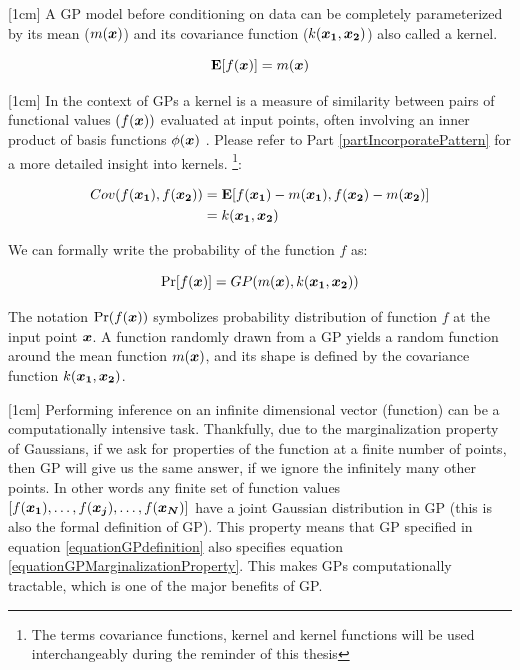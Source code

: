 [1cm]
A GP model before conditioning on data can be completely parameterized by its mean ($m(\boldsymbol{x})$) and its covariance function ($k(\boldsymbol{x_1}, \boldsymbol{x_2})$) also called a kernel. 

\begin{equation}\label{eq:meanGP}
\mathbf{E}[f(\boldsymbol{x})] = m(\boldsymbol{x})
\end{equation}

[1cm]
In the context of GPs a kernel is a measure of similarity between pairs of functional values $(f(\boldsymbol{x}))$ evaluated at input points, often involving an inner product of basis functions $\phi(\boldsymbol{x})$ \cite{bishop2006pattern}. Please refer to Part \ref{partIncorporatePattern} for a more detailed insight into kernels.   \footnote{The terms covariance functions, kernel and kernel functions will be used interchangeably during the reminder of this thesis}:

\begin{align}\label{eq:covarianceGP}
Cov(f(\boldsymbol{x_1}), f(\boldsymbol{x_2})) & = \mathbf{E}[f(\boldsymbol{x_1}) - m(\boldsymbol{x_1}), f(\boldsymbol{x_2}) - m(\boldsymbol{x_2})] \\
& = k(\boldsymbol{x_1}, \boldsymbol{x_2})\\
\end{align}

We can formally write the probability of the function $f$ as:

\begin{equation}\label{equationGPdefinition}
\Pr[f(\boldsymbol{x})] = GP(m(\boldsymbol{x}), k(\boldsymbol{x_1}, \boldsymbol{x_2}))
\end{equation}

The notation $\Pr(f(\boldsymbol{x}))$ symbolizes probability distribution of function $f$ at the input point $\boldsymbol{x}$. A function randomly drawn from a GP yields a random function around the mean function $m(\boldsymbol{x})$, and its shape is defined by the covariance function $k(\boldsymbol{x_1}, \boldsymbol{x_2})$. 

[1cm]
Performing inference on an infinite dimensional vector (function) can be a computationally intensive task. Thankfully, due to the marginalization property of Gaussians, if we ask for properties of the function at a finite number of points, then  GP will give us the same answer, if we ignore the infinitely many other points. In other words any finite set of function values $[f(\boldsymbol{x_1}), \ldots, f(\boldsymbol{x_j}), \ldots, f(\boldsymbol{x_N})]$ have a joint Gaussian distribution in GP (this is also the formal definition of GP). This property means that GP specified in equation \ref{equationGPdefinition} also specifies equation \ref{equationGPMarginalizationProperty}. This makes GPs computationally tractable, which is one of the major benefits of GP. 

